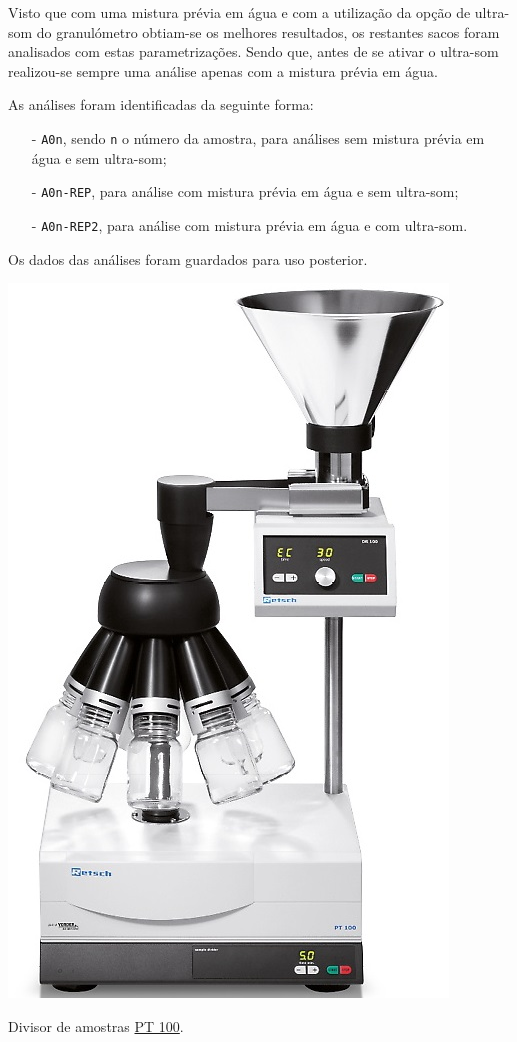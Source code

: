 Visto que com uma mistura prévia em água e com a utilização da opção de ultra-som do granulómetro obtiam-se os melhores resultados, os restantes sacos foram analisados com estas parametrizações.
Sendo que, antes de se ativar o ultra-som realizou-se sempre uma análise apenas com a mistura prévia em água.

As análises foram identificadas da seguinte forma:
\begin{itemize}
    \item[-] \texttt{A0n}, sendo \texttt{n} o número da amostra, para análises sem mistura prévia em água e sem ultra-som;
    \item[-] \texttt{A0n-REP}, para análise com mistura prévia em água e sem ultra-som;
    \item[-] \texttt{A0n-REP2}, para análise com mistura prévia em água e com ultra-som.
\end{itemize}


Os dados das análises foram guardados para uso posterior.

\hrulefill
\pagebreak


\label{day:31-outubro-2024}

\begin{marginfigure}[3\baselineskip]
    \centering
    \includegraphics[width=0.55\linewidth]{figures/divisor_de_amostras_retsch}
    \caption{Divisor de amostras \href{https://www.retsch.pt/pt/produtos/assistencia/amostradores/pt-100/}{PT 100}.}
    \label{fig:divisor_de_amostras_retsch}
\end{marginfigure}

